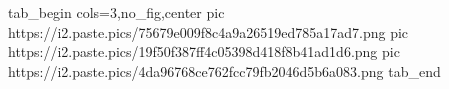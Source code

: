  
 
 
 
 


\ifcmt
  tab_begin cols=3,no_fig,center
     pic https://i2.paste.pics/75679e009f8c4a9a26519ed785a17ad7.png
		 pic https://i2.paste.pics/19f50f387ff4c05398d418f8b41ad1d6.png
		 pic https://i2.paste.pics/4da96768ce762fcc79fb2046d5b6a083.png
  tab_end
\fi
